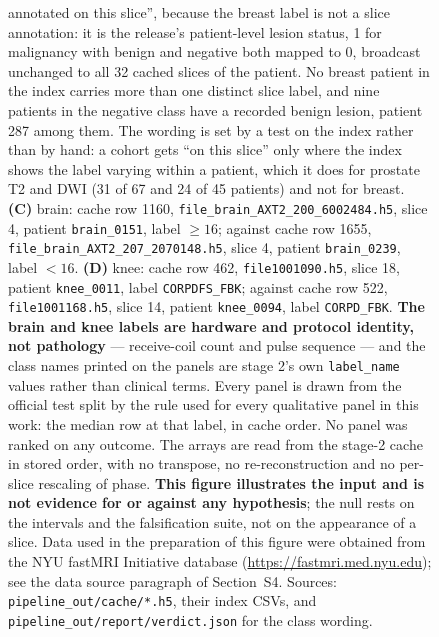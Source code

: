 \documentclass[11pt,a4paper]{article}
\begin{document}
\begin{figure}[p]
{{annotated on this slice'', because the breast label is not a slice annotation}: it
is the release's patient-level lesion status, 1 for malignancy with benign and
negative both mapped to 0, broadcast unchanged to all 32 cached slices of the
patient. No breast patient in the index carries more than one distinct slice label,
and nine patients in the negative class have a recorded benign lesion, patient 287
among them. The wording is set by a test on the index rather than by hand: a cohort
gets ``on this slice'' only where the index shows the label varying within a
patient, which it does for prostate T2 and DWI (31 of 67 and 24 of 45 patients) and
not for breast.
\textbf{(C)} brain: cache row 1160,
\texttt{file\_brain\_AXT2\_200\_6002484.h5}, slice 4, patient \texttt{brain\_0151},
label $\geq 16$; against cache row 1655,
\texttt{file\_brain\_AXT2\_207\_2070148.h5}, slice 4, patient \texttt{brain\_0239},
label $<16$. \textbf{(D)} knee: cache row 462, \texttt{file1001090.h5}, slice 18,
patient \texttt{knee\_0011}, label \texttt{CORPDFS\_FBK}; against cache row 522,
\texttt{file1001168.h5}, slice 14, patient \texttt{knee\_0094}, label
\texttt{CORPD\_FBK}. \textbf{The brain and knee labels are hardware and protocol
identity, not pathology} --- receive-coil count and pulse sequence --- and the class
names printed on the panels are stage 2's own \texttt{label\_name} values rather than
clinical terms. Every panel is drawn from the official test split by the rule used for
every qualitative panel in this work: the median row at that label, in cache order. No
panel was ranked on any outcome. The arrays are read from the stage-2 cache in stored
order, with no transpose, no re-reconstruction and no per-slice rescaling of phase.
\textbf{This figure illustrates the input and is not evidence for or against any
hypothesis}; the null rests on the intervals and the falsification suite, not on the
appearance of a slice. Data used in the preparation of this figure were obtained from
the NYU fastMRI Initiative database (\url{https://fastmri.med.nyu.edu}); see the data
source paragraph of Section~S4. Sources: \texttt{pipeline\_out/cache/*.h5}, their index
CSVs, and \texttt{pipeline\_out/report/verdict.json} for the class wording.}
\label{fig:qualcohorts}
\end{figure}
\end{document}
